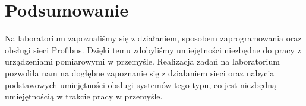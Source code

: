 \documentclass{article}
\begin{document}
\newpage
\section{Podsumowanie}
Na laboratorium zapoznaliśmy się z działaniem, sposobem zaprogramowania oraz obsługi sieci Profibus. Dzięki temu zdobyliśmy umiejętności niezbędne do pracy z urządzeniami pomiarowymi w przemyśle. Realizacja zadań na laboratorium pozwoliła nam na dogłębne zapoznanie się z działaniem sieci oraz nabycia podstawowych umiejętności obsługi systemów tego typu, co jest niezbędną umiejętnością w trakcie pracy w przemyśle.
\end{document}
